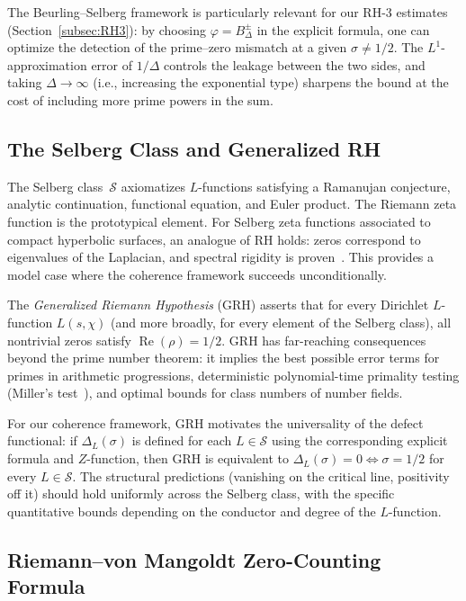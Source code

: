 \documentclass[11pt]{article}
\theoremstyle{remark}
\DeclareMathOperator{\Rea}{Re}
\begin{document}
The Beurling--Selberg framework is particularly relevant for our RH-3 estimates
(Section~\ref{subsec:RH3}): by choosing $\varphi=B^\pm_\Delta$ in the explicit
formula, one can optimize the detection of the prime--zero mismatch at a given
$\sigma\neq 1/2$.
The $L^1$-approximation error of $1/\Delta$ controls the leakage between the
two sides, and taking $\Delta\to\infty$ (i.e., increasing the exponential type)
sharpens the bound at the cost of including more prime powers in the sum.

\subsection{The Selberg Class and Generalized RH}

The Selberg class~$\mathcal{S}$ axiomatizes $L$-functions satisfying a Ramanujan
conjecture, analytic continuation, functional equation, and Euler product.
The Riemann zeta function is the prototypical element.
For Selberg zeta functions associated to compact hyperbolic surfaces, an analogue of RH
holds: zeros correspond to eigenvalues of the Laplacian, and spectral rigidity is
proven~\cite{Selberg}.
This provides a model case where the coherence framework succeeds unconditionally.

The \emph{Generalized Riemann Hypothesis} (GRH) asserts that for every Dirichlet
$L$-function $L(s,\chi)$ (and more broadly, for every element of the Selberg class),
all nontrivial zeros satisfy $\Rea(\rho)=1/2$.
GRH has far-reaching consequences beyond the prime number theorem: it implies
the best possible error terms for primes in arithmetic progressions, deterministic
polynomial-time primality testing (Miller's test~\cite{Miller}), and optimal bounds
for class numbers of number fields.

For our coherence framework, GRH motivates the universality of the defect functional:
if $\Delta_L(\sigma)$ is defined for each $L\in\mathcal{S}$ using the corresponding
explicit formula and $Z$-function, then GRH is equivalent to
$\Delta_L(\sigma)=0\Leftrightarrow\sigma=1/2$ for every $L\in\mathcal{S}$.
The structural predictions (vanishing on the critical line, positivity off it) should
hold uniformly across the Selberg class, with the specific quantitative bounds
depending on the conductor and degree of the $L$-function.

\subsection{Riemann--von Mangoldt Zero-Counting Formula}
\label{subsec:zero-counting}
\end{document}

